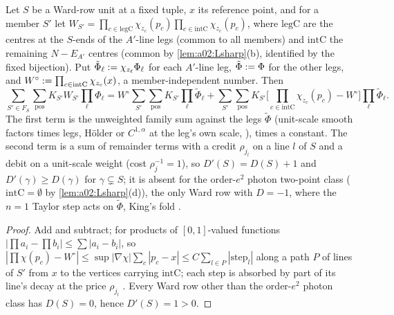 \begin{lemma}\label{lem:a02:FW}
Let $S$ be a Ward-row unit at a fixed tuple, $x$ its reference point, and for a member $S'$ let $W_{S'}=\prod_{c\in\mathrm{legC}}\chi_{z_c}(p_c)\prod_{c\in\mathrm{intC}}\chi_{z_c}(p_c)$, where $\mathrm{legC}$ are the centres at the $S$-ends of the $A'$-line legs (common to all members) and $\mathrm{intC}$ the remaining $N-E_{A'}$ centres (common by \cref{lem:a02:Lsharp}(b), identified by the fixed bijection). Put $\tilde\Phi_\ell:=\chi_{z_\ell}\Phi_\ell$ for each $A'$-line leg, $\tilde\Phi:=\Phi$ for the other legs, and $W^\circ:=\prod_{c\in\mathrm{intC}}\chi_{z_c}(x)$, a member-independent number. Then
\[
\sum_{S'\in F_S}\sum_{\mathrm{pos}}K_{S'}W_{S'}\prod_\ell\Phi_\ell=W^\circ\sum_{S'}\sum_{\mathrm{pos}}K_{S'}\prod_\ell\tilde\Phi_\ell+\sum_{S'}\sum_{\mathrm{pos}}K_{S'}\Big[\prod_{c\in\mathrm{intC}}\chi_{z_c}(p_c)-W^\circ\Big]\prod_\ell\tilde\Phi_\ell.
\]
The first term is the unweighted family sum against the legs $\tilde\Phi$ (unit-scale smooth factors times legs, H\"older or $C^{1,\alpha}$ at the leg's own scale, \cite[(3.85), p.~665]{K1}), times a constant. The second term is a sum of remainder terms with a credit $\rho_{j_l}$ on a line $l$ of $S$ and a debit on a unit-scale weight (cost $\rho_j^{-1}=1$), so $D'(S)=D(S)+1$ and $D'(\gamma)\ge D(\gamma)$ for $\gamma\subsetneq S$; it is absent for the order-$e^2$ photon two-point class ($\mathrm{intC}=\emptyset$ by \cref{lem:a02:Lsharp}(d)), the only Ward row with $D=-1$, where the $n=1$ Taylor step acts on $\tilde\Phi$, King's fold \cite[(3.85)]{K1}.
\end{lemma}
\begin{proof}
Add and subtract; for products of $[0,1]$-valued functions $|\prod a_i-\prod b_i|\le\sum|a_i-b_i|$, so $|\prod\chi(p_c)-W^\circ|\le\sup|\nabla\chi|\sum_{c}|p_c-x|\le C\sum_{l\in P}|\mathrm{step}_l|$ along a path $P$ of lines of $S'$ from $x$ to the vertices carrying $\mathrm{intC}$; each step is absorbed by part of its line's decay at the price $\rho_{j_l}$ \cite[(3.13)--(3.14), (3.19)]{Ba3}. Every Ward row other than the order-$e^2$ photon class has $D(S)=0$, hence $D'(S)=1>0$.
\end{proof}
